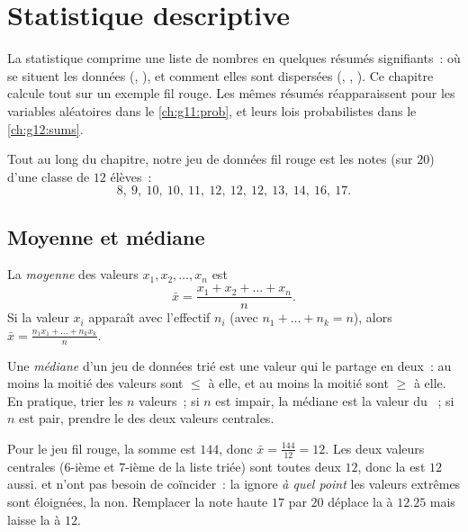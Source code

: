 \chapter{Statistique descriptive}\label{ch:g11:stat}

La statistique comprime une liste de nombres en quelques résumés
signifiants~: où se situent les données (, ), et comment
elles sont dispersées (, , ). Ce chapitre
calcule tout sur un exemple fil rouge. Les mêmes résumés réapparaissent
pour les variables aléatoires dans le \cref{ch:g11:prob}, et leurs lois
probabilistes dans le \cref{ch:g12:sums}.

Tout au long du chapitre, notre jeu de données fil rouge est les notes
(sur $20$) d'une classe de $12$ élèves~:
\[
8,\ 9,\ 10,\ 10,\ 11,\ 12,\ 12,\ 12,\ 13,\ 14,\ 16,\ 17 .
\]

\section{Moyenne et médiane}

\begin{definition}[Moyenne]\label{def:g11:stat:mean}
La \emph{moyenne} des valeurs $x_1, x_2, \dots, x_n$ est
\[
\bar x = \frac{x_1 + x_2 + \dots + x_n}{n}.
\]
Si la valeur $x_i$ apparaît avec l'effectif $n_i$ (avec
$n_1 + \dots + n_k = n$), alors
$\bar x = \frac{n_1 x_1 + \dots + n_k x_k}{n}$.
\end{definition}

\begin{definition}[Médiane]\label{def:g11:stat:median}
Une \emph{médiane} d'un jeu de données trié est une valeur
qui le partage en deux~: au moins la moitié des valeurs sont $\leq$ à
elle, et au moins la moitié sont $\geq$ à elle. En pratique, trier les
$n$ valeurs~; si $n$ est impair, la médiane est la valeur du ~; si
$n$ est pair, prendre le  des deux valeurs centrales.
\end{definition}

\begin{example}\label{ex:g11:stat:meanmedian}
Pour le jeu fil rouge, la somme est $144$, donc $\bar x = \frac{144}{12}
= 12$. Les deux valeurs centrales ($6$-ième et $7$-ième de la liste
triée) sont toutes deux $12$, donc la  est $12$ aussi.  et
 n'ont pas besoin de coïncider~: la  ignore \emph{à quel
point} les valeurs extrêmes sont éloignées, la  non. Remplacer la
note haute $17$ par $20$ déplace la  à $12.25$ mais laisse la
 à $12$.
\end{example}

